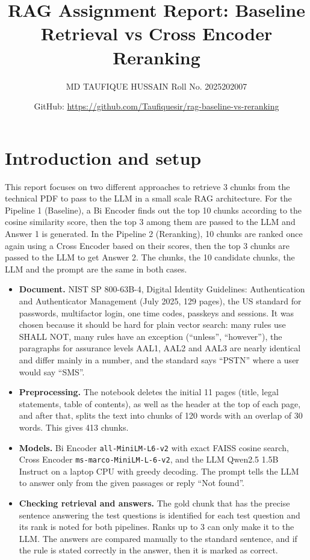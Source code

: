 \documentclass[11pt,a4paper]{article}
\title{RAG Assignment Report: Baseline Retrieval vs Cross Encoder Reranking}
\author{MD TAUFIQUE HUSSAIN \quad Roll No. 2025202007}
\date{GitHub: \url{https://github.com/Taufiquesir/rag-baseline-vs-reranking}}
\begin{document}
\maketitle
\vspace{-1.2em}

\section{Introduction and setup}

This report focuses on two different approaches to retrieve 3 chunks from the technical PDF to pass to the LLM in a small scale RAG architecture. For the Pipeline 1 (Baseline), a Bi Encoder finds out the top 10 chunks according to the cosine similarity score, then the top 3 among them are passed to the LLM and Answer 1 is generated. In the Pipeline 2 (Reranking), 10 chunks are ranked once again using a Cross Encoder based on their scores, then the top 3 chunks are passed to the LLM to get Answer 2. The chunks, the 10 candidate chunks, the LLM and the prompt are the same in both cases.
\begin{itemize}
\item \textbf{Document.} NIST SP 800-63B-4, Digital Identity Guidelines: Authentication and Authenticator Management (July 2025, 129 pages), the US standard for passwords, multifactor login, one time codes, passkeys and sessions. It was chosen because it should be hard for plain vector search: many rules use SHALL NOT, many rules have an exception (``unless'', ``however''), the paragraphs for assurance levels AAL1, AAL2 and AAL3 are nearly identical and differ mainly in a number, and the standard says ``PSTN'' where a user would say ``SMS''.
\item \textbf{Preprocessing.} The notebook deletes the initial 11 pages (title, legal statements, table of contents), as well as the header at the top of each page, and after that, splits the text into chunks of 120 words with an overlap of 30 words. This gives 413 chunks.
\item \textbf{Models.} Bi Encoder \texttt{all-MiniLM-L6-v2} with exact FAISS cosine search, Cross Encoder \texttt{ms-marco-MiniLM-L-6-v2}, and the LLM Qwen2.5 1.5B Instruct on a laptop CPU with greedy decoding. The prompt tells the LLM to answer only from the given passages or reply ``Not found''.
\item \textbf{Checking retrieval and answers.} 
The gold chunk that has the precise sentence answering the test questions is identified for each test question and its rank is noted for both pipelines. Ranks up to 3 can only make it to the LLM. The answers are compared manually to the standard sentence, and if the rule is stated correctly in the answer, then it is marked as correct.
\end{itemize}
\end{document}
